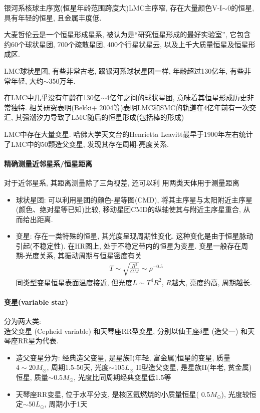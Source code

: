 银河系核球主序宽(恒星年龄范围跨度大)LMC主序窄, 存在大量颜色V-I$\sim$0的恒星, 具有年轻的恒星, 且金属丰度低. 

\small
大麦哲伦云是一个恒星形成星系, 被认为是``研究恒星形成的最好实验室'', 它包含约60个球状星团, 700个疏散星团, 400个行星状星云, 以及上千大质量恒星及恒星形成区. 

LMC球状星团, 有些非常古老, 跟银河系球状星团一样, 年龄超过130亿年, 有些非常年轻, 大约$\sim$350万年. 

在LMC中几乎没有年龄在130亿$\sim$4亿年之间的球状星团, 意味着其恒星形成历史非常独特. 相关研究表明(Bekki+ 2004等)表明LMC和SMC的轨道在4亿年前有一次交汇, 其强潮汐力导致了LMC随后的恒星形成(包括棒的形成)

LMC中存在大量变星. 哈佛大学天文台的Henrietta Leavitt最早于1900年左右统计了LMC中的50颗造父变星, 发现其存在周期-亮度关系. 
\normalsize

\paragraph{精确测量近邻星系/恒星距离}
对于近邻星系, 其距离测量除了三角视差, 还可以利
用两类天体用于测量距离
\begin{itemize}\small 
    \item 球状星团: 可以利用星团的颜色-星等图(CMD), 将其主序星与太阳附近主序星(颜色、绝对星等已知)比较, 移动星团CMD的纵轴使其与附近主序星重合, 从而给出距离. 
    \item 变星: 存在一类特殊的恒星, 其光度呈现周期性变化. 这种变化是由于恒星脉动引起(不稳定性). 在HR图上, 处于不稳定带内的恒星为变星. 
    \subitem 变星一般存在周期-光度关系, 其振动周期与恒星密度有关
    \begin{align*}
        T\sim \sqrt{\frac{R^3}{GM}}\sim \rho^{-0.5}
    \end{align*}
    同类型变星恒星表面温度接近, 但光度$L\sim T^4 R^2$, $R$越大, 亮度约高, 周期越长. 
\end{itemize}

\paragraph{变星(variable star)}
分为两大类: \\造父变星 (Cepheid variable) 和天琴座RR型变星, 分别以仙王座$\delta$星 (造父一) 和天琴座RR星为代表. 
\begin{itemize}\small
    \item 造父变星分为: 
    \subitem 经典造父变星, 是星族I(年轻, 富金属)恒星的变星, 质量$4\sim 20M_{\odot}$, 周期1.5-50天, 光度$\sim 10 5L_{\odot}$
    \subitem II型造父变星, 是星族II(年老, 贫金属)恒星, 质量$\sim 0.5 M_{\odot}$,  光度比同周期经典变星低1.5等
    \item 天琴座RR变星, 位于水平分支, 是核区氦燃烧的小质量恒星( $0.5 M_{\odot}$), 光度较恒定$\sim 50L_{\odot}$, 周期小于1天
\end{itemize}


